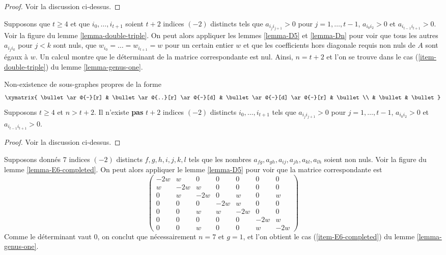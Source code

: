\begin{proof}
Voir la discussion ci-dessus.
\end{proof}

\noindent
Supposons que $t \geq 4$ et que $i_0, \ldots, i_{t + 1}$ soient
$t + 2$ indices $(-2)$ distincts tels que
$a_{i_ji_{j + 1}} > 0$ pour $j = 1, \ldots, t - 1$,
$a_{i_0i_2} > 0$ et $a_{i_{t - 1}i_{t + 1}} > 0$.
Voir la figure du lemme \ref{lemma-double-triple}.
On peut alors appliquer les lemmes \ref{lemma-D5} et \ref{lemma-Dn}
pour voir que tous les autres $a_{i_ji_k}$ pour $j < k$ sont nuls,
que $w_{i_0} = \ldots = w_{i_{t + 1}} = w$ pour un certain
entier $w$ et que les coefficients hors diagonale requis
non nuls de $A$ sont égaux à $w$.
Un calcul montre que le déterminant de la
matrice correspondante est nul. Ainsi, $n = t + 2$
et l'on se trouve dans le cas (\ref{item-double-triple}) du
lemme \ref{lemma-genus-one}.

\begin{lemma}
\label{lemma-double-triple}
Non-existence de sous-graphes propres de la forme
$$
\xymatrix{
\bullet \ar@{-}[r] & \bullet \ar@{..}[r] \ar@{-}[d] &
\bullet \ar@{-}[d] \ar@{-}[r] & \bullet \\
& \bullet & \bullet
}
$$
Supposons $t \geq 4$ et $n > t + 2$.
Il n'existe {\bf pas} $t + 2$ indices
$(-2)$ distincts $i_0, \ldots, i_{t + 1}$ tels que
$a_{i_ji_{j + 1}} > 0$ pour $j = 1, \ldots, t - 1$,
$a_{i_0i_2} > 0$ et $a_{i_{t - 1}i_{t + 1}} > 0$.
\end{lemma}

\begin{proof}
Voir la discussion ci-dessus.
\end{proof}

\noindent
Supposons donnés $7$ indices $(-2)$ distincts
$f,\allowbreak g,\allowbreak h,\allowbreak i,\allowbreak
j,\allowbreak k,\allowbreak l$
tels que les nombres
$a_{fg},\allowbreak a_{gh},\allowbreak a_{ij},\allowbreak
a_{jh},\allowbreak a_{kl},\allowbreak a_{lh}$ soient non nuls.
Voir la figure du lemme \ref{lemma-E6-completed}. On peut alors appliquer le
lemme \ref{lemma-D5} pour voir que la matrice correspondante est
$$
\left(
\begin{matrix}
-2w & w & 0 & 0 & 0 & 0 & 0 \\
w & -2w & w & 0 & 0 & 0 & 0 \\
0 & w & -2w & 0 & w & 0 & w \\
0 & 0 & 0 & -2w & w & 0 & 0 \\
0 & 0 & w & w & -2w & 0 & 0 \\
0 & 0 & 0 & 0 & 0 & -2w & w \\
0 & 0 & w & 0 & 0 & w & -2w
\end{matrix}
\right)
$$
Comme le déterminant vaut $0$, on conclut que nécessairement $n = 7$
et $g = 1$, et l'on obtient le cas (\ref{item-E6-completed})
du lemme \ref{lemma-genus-one}.

